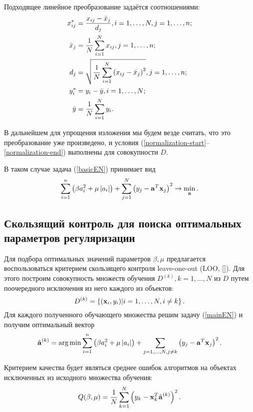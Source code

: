 \newcommand\oi[2]{#1=1, \ldots, #2}
Подходящее линейное преобразование задаётся соотношениями:
\begin{align*}
	x^*_{ij} 	&= \frac{x_{ij} - \bar x_j}{d_j}, \oi iN, \oi jn;\\
	\bar x_j 	&= \frac1N\suml_{i=1}^N x_{ij}, \oi jn;\\
	d_j 		&= \sqrt{\frac1N\suml_{i=1}^N \cbr{x_{ij}-\bar x_j}^2}, \oi jn;\\
	y^*_i 		&= y_i - \bar y, \oi iN;\\
	\bar y 		&= \frac1N\suml_{i=1}^N y_i. \\
\end{align*}

В дальнейшем для упрощения изложения мы будем везде считать, что это преобразование уже произведено, и условия (\ref{normalization-start}--\ref{normalization-end}) выполнены для совокупности $D.$

В таком случае задача (\ref{basicEN}) принимает вид
\begin{equation}
	\label{mainEN}
	\sum_{i=1}^n\left(\beta a_i^2 + \mu \left|a_i\right|\right) 
	+ \sum_{j=1}^N\left(y_j - \boldsymbol{\mathbf{a}}^T \boldsymbol{\mathbf{x}}_j\right)^2 
	\to \mathop{\mbox{min}}\limits_{\boldsymbol{\mathbf{a}}}.
\end{equation}

\subsection{Скользящий контроль для поиска оптимальных параметров регуляризации}
Для подбора оптимальных значений параметров $\beta, \mu$ предлагается воспользоваться критерием скользящего контроля leave-one-out (LOO, []).
Для этого построим совокупность множеств обучения $D^{(k)}, \oi kN$ из $D$ путем поочередного исключения из него каждого из объектов: 
\begin{equation}
	D^{(k)}=\fbr{(\mb x_i, y_i) \cond \oi iN, i\ne k}.
\end{equation}
Для каждого полученного обучающего множества решим задачу (\ref{mainEN}) и получим оптимальный вектор 
\begin{equation*}
	\hat{\mb a}^{(k)} 
	= \argmin \suml_{i=1}^n\cbr{\beta a_i^2 + \mu \modul{a_i}} 
	+ \suml_{\oi jN, j\ne k}\cbr{y_j - \mb a^T \mb x_j}^2.
\end{equation*}

Критерием качества будет являться среднее ошибок алгоритмов на объектах исключенных из исходного множества обучения:
\begin{equation}
	Q(\beta, \mu) = \frac1N\sum\limits_{k=1}^N \left(y_k - \boldsymbol{\mathbf{x}}_k^T\hat{\boldsymbol{\mathbf{a}}}^{(k)}\right)^2.
\end{equation}

